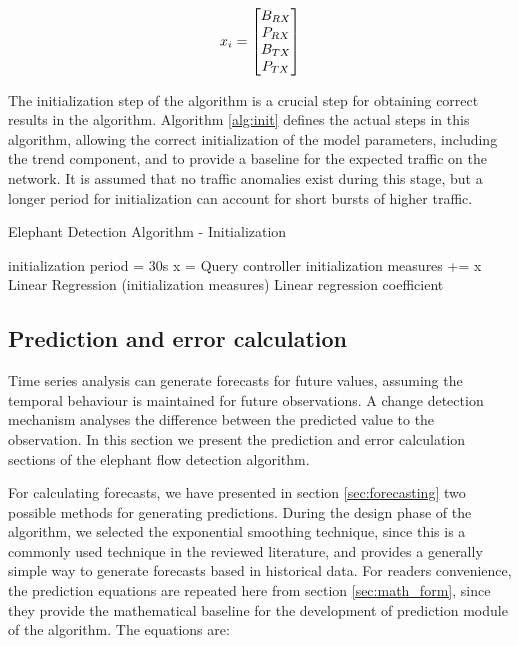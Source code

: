 \begin{equation}
    \centering
    x_i = 
    \begin{bmatrix}
    B_{RX}\\
    P_{RX}\\
    B_{TX}\\
    P_{TX}\\
    \end{bmatrix}
    \label{mat:port_stats}
\end {equation}

The initialization step of the algorithm is a crucial step for obtaining correct results in the algorithm. Algorithm \ref{alg:init} defines the actual steps in this
algorithm, allowing the correct initialization of the model parameters, including the trend component, and to provide a baseline for the expected traffic on the
network. It is assumed that no traffic anomalies exist during this stage, but a longer period for initialization can account for short bursts of higher traffic.

\begin{algorithm}[H]
    \caption{Elephant Detection Algorithm - Initialization} \label{alg:init}
    \begin{algorithmic}[1]
            \State initialization period = 30s
                \State x = Query controller
                \State initialization measures += x
            \EndWhile
            \State Linear Regression (initialization measures)
        \State \Return Linear regression coefficient
    \end{algorithmic}
\end{algorithm}


\subsection{Prediction and error calculation}

Time series analysis can generate forecasts for future values, assuming the temporal behaviour is maintained for future observations. A change detection mechanism
analyses the difference between the predicted value to the observation. In this section we present the prediction and error calculation sections of the elephant
flow detection algorithm.

\par For calculating forecasts, we have presented in section \ref{sec:forecasting} two possible methods for generating predictions. During the design phase of the 
algorithm, we selected the exponential smoothing technique, since this is a commonly used technique \cite{jasek_usage_2013, munz_traffic_2010} in the reviewed
literature, and provides a generally simple way to generate forecasts based in historical data. For readers convenience, the prediction equations are repeated 
here from section \ref{sec:math_form}, since they provide the mathematical baseline for the  development of prediction module of the algorithm. The equations are:

